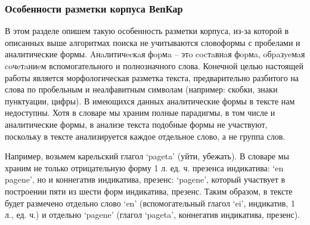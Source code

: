 \subsubsection{Особенности разметки корпуса ВепКар}\label{corpus_peculiarities}
В этом разделе опишем такую особенность разметки корпуса, из-за которой в описанных выше алгоритмах поиска не учитываются словоформы с пробелами и аналитические формы.
Aнaлитичecкaя фopмa – этo cocтaвнaя фopмa, oбpaзyeмaя coчeтaниeм вспомогательного и полнозначного слова.
Конечной целью настоящей работы является морфологическая разметка текста, предварительно разбитого на слова по пробельным и неалфавитным символам (например: скобки, знаки пунктуации, цифры). 
В имеющихся данных аналитические формы в тексте нам недоступны. 
Хотя в словаре мы храним полные парадигмы, в том числе и аналитические формы, в анализе текста подобные формы не участвуют, поскольку в тексте анализируется каждое отдельное слово, а не группа слов. 

Например, возьмем карельский глагол ‘pageta’ (уйти, убежать).
В словаре мы храним не только отрицательную форму 1 л. ед. ч. презенса индикатива: ‘en pagene’, но и коннегатив индикатива, презенс: ‘pagene’, который участвует в построении пяти из шести форм индикатива, презенс. 
Таким образом, в тексте будет размечено отдельно слово ‘en’ (вспомогательный глагол ‘ei’, индикатив, 1 л., ед. ч.) и отдельно ‘pagene’ (глагол ‘pageta’, коннегатив индикатива, презенс).
